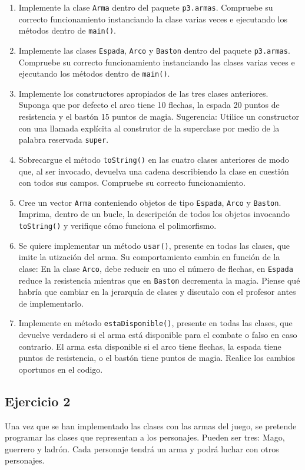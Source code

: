 \documentclass[english,a4paper,11pt]{article}
\begin{document}
\begin{enumerate}
\item Implemente la clase \texttt{Arma} dentro del paquete \texttt{p3.armas}. Compruebe su correcto funcionamiento instanciando la clase varias veces e ejecutando los métodos dentro de \texttt{main()}.
\item Implemente las clases \texttt{Espada}, \texttt{Arco} y \texttt{Baston} dentro del paquete \texttt{p3.armas}. Compruebe su correcto funcionamiento instanciando las clases varias veces e ejecutando los métodos dentro de \texttt{main()}.
\item Implemente los constructores apropiados de las tres clases anteriores. Suponga que por defecto el arco tiene 10 flechas, la espada 20 puntos de resistencia y el bastón 15 puntos de magia. Sugerencia: Utilice un constructor con una llamada explícita al construtor de la superclase por medio de la palabra reservada \texttt{super}.
\item Sobrecargue el método \texttt{toString()} en las cuatro clases anteriores de modo que, al ser invocado, devuelva una cadena describiendo la clase en cuestión con todos sus campos. Compruebe su correcto funcionamiento.
\item Cree un vector \texttt{Arma} conteniendo objetos de tipo \texttt{Espada}, \texttt{Arco} y \texttt{Baston}. Imprima, dentro de un bucle, la descripción de todos los objetos invocando \texttt{toString()} y verifique cómo funciona el polimorfismo.
\item Se quiere implementar un método \texttt{usar()}, presente en todas las clases, que imite la utización del arma. Su comportamiento cambia en función de la clase: En la clase \texttt{Arco}, debe reducir en uno el número de flechas, en \texttt{Espada} reduce la resistencia mientras que en \texttt{Baston} decrementa la magia. Piense qué habría que cambiar en la jerarquía de clases y discutalo con el profesor antes de implementarlo.
\item Implemente en método \texttt{estaDisponible()}, presente en todas las clases, que devuelve verdadero si el arma está disponible para el combate o falso en caso contrario. El arma esta disponible si el arco tiene flechas, la espada tiene puntos de resistencia, o el bastón tiene puntos de magia. Realice los cambios oportunos en el codigo.
\end{enumerate}

\subsection*{Ejercicio 2}
Una vez que se han implementado las clases con las armas del juego, se pretende programar las clases que representan a los personajes. Pueden ser tres: Mago, guerrero y ladrón. Cada personaje tendrá un arma y podrá luchar con otros personajes. 
\end{document}
